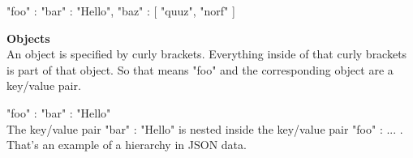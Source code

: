 "foo" : {
  "bar" : "Hello",
  "baz" : [ "quuz", "norf" ]
}

\textbf{Objects}\\

An object is specified by curly brackets. Everything inside of that curly brackets is part of that object. So that means "foo" and the corresponding object are a key/value pair.

"foo" : {
  "bar" : "Hello"
}\\
The key/value pair "bar" : "Hello" is nested inside the key/value pair "foo" : { ... }. \\
That's an example of a hierarchy in JSON data.

